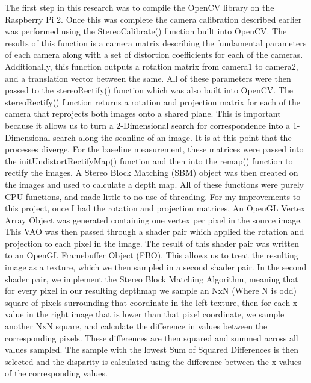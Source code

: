 The first step in this research was to compile the OpenCV library on the Raspberry Pi 2.  Once this was complete the camera calibration described earlier was performed using the StereoCalibrate() function built into OpenCV.  The results of this function is a camera matrix describing the fundamental parameters of each camera along with a set of distortion coefficients for each of the cameras.  Additionally, this function outputs a rotation matrix from camera1 to camera2, and a translation vector between the same.  All of these parameters were then passed to the stereoRectify() function which was also built into OpenCV.  The stereoRectify() function returns a rotation and projection matrix for each of the camera that reprojects both images onto a shared plane.  This is important because it allows us to turn a 2-Dimensional search for correspondence into a 1-Dimensional search along the scanline of an image.  It is at this point that the processes diverge.  For the baseline measurement, these matrices were passed into the initUndistortRectifyMap() function and then into the remap() function to rectify the images.  A Stereo Block Matching (SBM) object was then created on the images and used to calculate a depth map.  All of these functions were purely CPU functions, and made little to no use of threading.  For my improvements to this project, once I had the rotation and projection matrices, An OpenGL Vertex Array Object was generated containing one vertex per pixel in the source image.  This VAO was then passed through a shader pair which applied the rotation and projection to each pixel in the image.  The result of this shader pair was written to an OpenGL Framebuffer Object (FBO).  This allows us to treat the resulting image as a texture, which we then sampled in a second shader pair.  In the second shader pair, we implement the Stereo Block Matching Algorithm, meaning that for every pixel in our resulting depthmap we sample an NxN (Where N is odd) square of pixels surrounding that coordinate in the left texture, then for each x value in the right image that is lower than that pixel coordinate, we sample another NxN square, and calculate the difference in values between the corresponding pixels.  These differences are then squared and summed across all values sampled.  The sample with the lowest Sum of Squared Differences is then selected and the disparity is calculated using the difference between the x values of the corresponding values.  